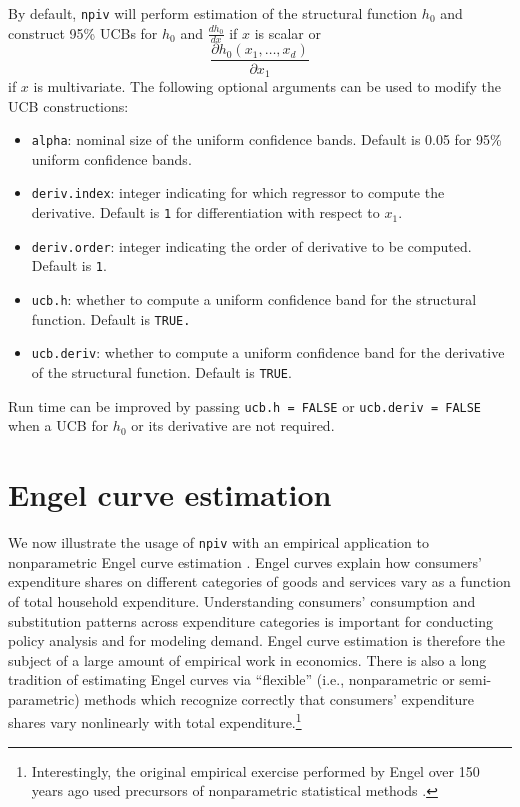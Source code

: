 \documentclass[
]{jss}
\begin{document}
By default, \texttt{npiv} will perform estimation of the structural
function \(h_0\) and construct 95\% UCBs for \(h_0\) and
\(\frac{d h_0}{dx}\) if \(x\) is scalar or \[
 \frac{\partial h_0(x_1,\ldots,x_d)}{\partial x_1}
\] if \(x\) is multivariate. The following optional arguments can be
used to modify the UCB constructions:

\begin{itemize}
\item
  \texttt{alpha}: nominal size of the uniform confidence bands. Default
  is 0.05 for 95\% uniform confidence bands.
\item
  \texttt{deriv.index}: integer indicating for which regressor to
  compute the derivative. Default is \texttt{1} for differentiation with
  respect to \(x_1\).
\item
  \texttt{deriv.order}: integer indicating the order of derivative to be
  computed. Default is \texttt{1}.
\item
  \texttt{ucb.h}: whether to compute a uniform confidence band for the
  structural function. Default is \texttt{TRUE.}
\item
  \texttt{ucb.deriv}: whether to compute a uniform confidence band for
  the derivative of the structural function. Default is \texttt{TRUE}.
\end{itemize}

Run time can be improved by passing \texttt{ucb.h\ =\ FALSE} or
\texttt{ucb.deriv\ =\ FALSE} when a UCB for \(h_0\) or its derivative
are not required.

\hypertarget{engel}{%
\section{Engel curve estimation}\label{engel}}

We now illustrate the usage of \texttt{npiv} with an empirical
application to nonparametric Engel curve estimation \citep{BCK}. Engel
curves explain how consumers' expenditure shares on different categories
of goods and services vary as a function of total household expenditure.
Understanding consumers' consumption and substitution patterns across
expenditure categories is important for conducting policy analysis and
for modeling demand. Engel curve estimation is therefore the subject of
a large amount of empirical work in economics. There is also a long
tradition of estimating Engel curves via ``flexible'' (i.e.,
nonparametric or semi-parametric) methods which recognize correctly that
consumers' expenditure shares vary nonlinearly with total
expenditure.\footnote{Interestingly, the original empirical exercise
  performed by Engel over 150 years ago used precursors of nonparametric
  statistical methods \citep{CM}.}
\end{document}
